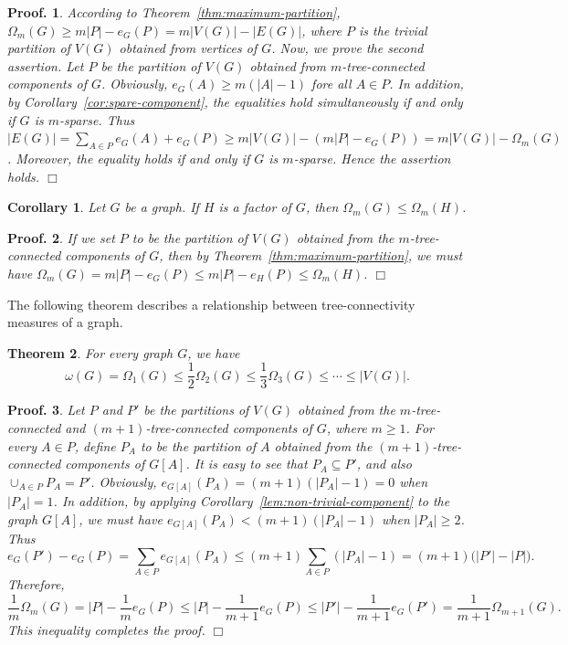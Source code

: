 \documentclass[10pt,bezier]{article}
\newtheorem{prethm}{{\bf Theorem}}[section]
\newenvironment{thm}{\begin{prethm}{\hspace{-0.5
em}{\bf.}}}{\end{prethm}}
\newtheorem{precor}[prethm]{{\bf Corollary}}
\newenvironment{cor}{\begin{precor}{\hspace{-0.5
em}{\bf.}}}{\end{precor}}
\newtheorem{preproof}{{\bf Proof.}}
\newenvironment{proof}[1]{\begin{preproof}{\rm
#1}\hfill{$\Box$}}{\end{preproof}}
\begin{document}
%
\begin{proof}
{According to Theorem~\ref{thm:maximum-partition}, $\Omega_m(G) \ge m|P|-e_G(P)=m|V(G)|-|E(G)|$, where 
 $P$ is the trivial partition of $V(G)$ obtained from vertices of $G$. Now, we prove the second assertion.
Let $P$ be the partition of $V(G)$ obtained from $m$-tree-connected components of $G$. Obviously, $e_G(A)\ge m(|A|-1)$ fore all $A\in P$. In addition, by Corollary~\ref{cor:spare-component}, the equalities hold simultaneously if and only if $G$ is $m$-sparse.
Thus $|E(G)|=\sum_{A\in P}e_G(A)+e_G(P)\ge m|V(G)| -(m|P|-e_G(P))=m|V(G)|-\Omega_m(G)$.
Moreover, the equality holds if and only if $G$ is $m$-sparse.
Hence the assertion holds.
}\end{proof}
%
\begin{cor}\label{cor:comparing:e}
{Let $G$ be a graph. If $H$ is a factor of $G$, then $\Omega_m(G)\le \Omega_m(H)$.
}\end{cor}
%
\begin{proof}
{If we set $P$ to be the partition of $V(G)$ obtained from the $m$-tree-connected components of $G$, 
then by Theorem~\ref{thm:maximum-partition}, we must have 
$\Omega_m(G)=m|P|-e_{G}(P) \le m|P|-e_{H}(P)\le \Omega_m(H)$.
}\end{proof}
%
The following theorem describes a relationship between tree-connectivity measures of a graph.
%
\begin{thm}\label{thm:comparison}
{For every graph $G$, we have 
$$\omega(G)=\Omega_1(G)\le \frac{1}{2}\Omega_{2}(G)\le \frac{1}{3}\Omega_{3}(G) \le \cdots \le |V(G)|.$$
}\end{thm}
%
\begin{proof}
{Let $P$ and $P'$ be the partitions of $V(G)$ obtained from the $m$-tree-connected and 
$(m+1)$-tree-connected components of $G$, where $m\ge 1$.
For every $A\in P$, define $P_A$ to be the partition of $A$ obtained from the $(m+1)$-tree-connected components of $G[A]$.
It is easy to see that $P_A\subseteq P'$, and also $\cup_{A\in P}P_A=P'$.
Obviously, $e_{G[A]}(P_A) = (m+1)(|P_A|-1)=0$ when $|P_A|= 1$.
In addition, by applying Corollary~\ref{lem:non-trivial-component} to the graph $G[A]$, we must have
 $e_{G[A]}(P_A) < (m+1)(|P_A|-1)$ when $|P_A|\ge 2$.
Thus $$ e_G(P')- e_G(P)=
\sum_{A\in P}e_{G[A]}(P_A)\le 
(m+1)\sum_{A\in P}(|P_A|-1)=
(m+1)\big(|P'|-|P|\big).$$
Therefore, 
$$\frac{1}{m}\Omega_{m}(G)=|P|-\frac{1}{m}e_G(P)\le |P|-\frac{1}{m+1}e_G(P) \le |P'|-\frac{1}{m+1}e_G(P')=\frac{1}{m+1}\Omega_{m+1}(G).$$
This inequality completes the proof.
}\end{proof}
%
%
%
%
%
%						
%
\end{document}

